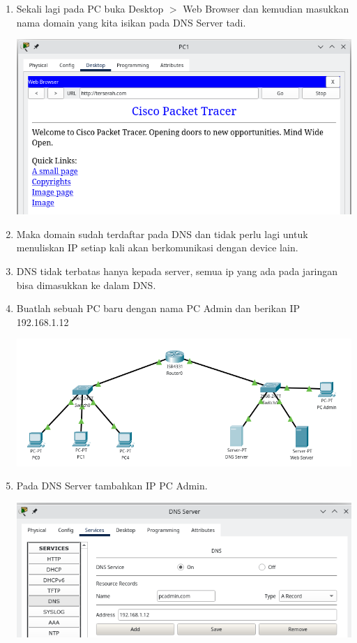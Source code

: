 \documentclass{article}
\begin{document}
\begin{flushleft}
\begin{enumerate}
            \item Sekali lagi pada PC buka Desktop $>$ Web Browser dan kemudian masukkan nama domain yang kita isikan pada DNS Server tadi.
            
            \begin{center}
                \includegraphics[scale=0.5]{3-11.png}
            \end{center}

            \item Maka domain sudah terdaftar pada DNS dan tidak perlu lagi untuk menuliskan IP setiap kali akan berkomunikasi dengan device lain.

            \item DNS tidak terbatas hanya kepada server, semua ip yang ada pada jaringan bisa dimasukkan ke dalam DNS.

            \item Buatlah sebuah PC baru dengan nama PC Admin dan berikan IP 192.168.1.12
            \begin{center}
                \includegraphics[scale=0.5]{3-12.png}
            \end{center}

            \item Pada DNS Server tambahkan IP PC Admin.
            \begin{center}
                \includegraphics[scale=0.5]{3-13.png}
            \end{center}


\end{enumerate}
\end{flushleft}
\end{document}
